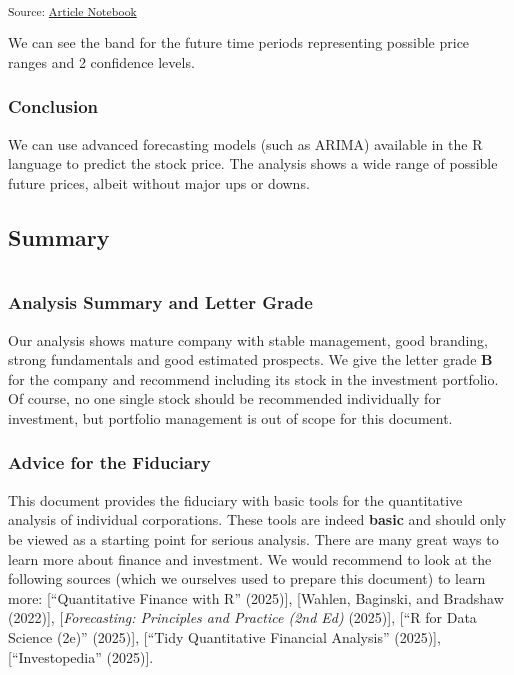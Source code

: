 \documentclass[
  letterpaper,
  DIV=11,
  numbers=noendperiod]{scrartcl}
\begin{document}
\textsubscript{Source:
\href{https://ds-an.github.io/computational-finance-project/index.qmd.html}{Article
Notebook}}

We can see the band for the future time periods representing possible
price ranges and 2 confidence levels.

\subsubsection{\texorpdfstring{\textbf{Conclusion}}{Conclusion}}\label{conclusion-5}

We can use advanced forecasting models (such as ARIMA) available in the
R language to predict the stock price. The analysis shows a wide range
of possible future prices, albeit without major ups or downs.

\subsection{Summary}\label{summary}

\section{}\label{section}

\subsubsection{\texorpdfstring{\textbf{Analysis Summary and Letter
Grade}}{Analysis Summary and Letter Grade}}\label{analysis-summary-and-letter-grade}

Our analysis shows mature company with stable management, good branding,
strong fundamentals and good estimated prospects. We give the letter
grade \textbf{B} for the company and recommend including its stock in
the investment portfolio. Of course, no one single stock should be
recommended individually for investment, but portfolio management is out
of scope for this document.

\subsubsection{\texorpdfstring{\textbf{Advice for the
Fiduciary}}{Advice for the Fiduciary}}\label{advice-for-the-fiduciary}

This document provides the fiduciary with basic tools for the
quantitative analysis of individual corporations. These tools are indeed
\textbf{basic} and should only be viewed as a starting point for serious
analysis. There are many great ways to learn more about finance and
investment. We would recommend to look at the following sources (which
we ourselves used to prepare this document) to learn more:
{[}{``Quantitative Finance with {R}''} (2025){]}, {[}Wahlen, Baginski,
and Bradshaw (2022){]}, {[}\emph{Forecasting: {Principles} and
{Practice} (2nd Ed)} (2025){]}, {[}{``R for {Data Science} (2e)''}
(2025){]}, {[}{``Tidy {Quantitative Financial Analysis}''} (2025){]},
{[}{``Investopedia''} (2025){]}.
\end{document}
